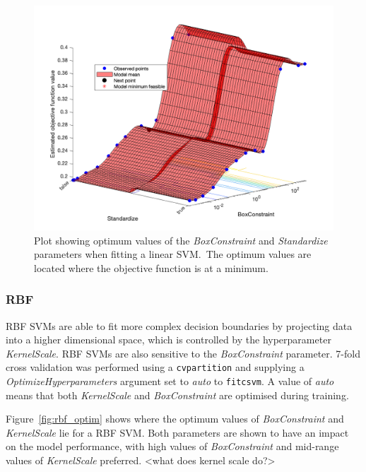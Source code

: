 \begin{figure}[ht]
  \centering
  \includegraphics[width=\textwidth]{figures/linear_optim.png}
  \caption{Plot showing optimum values of the \textit{BoxConstraint} and
  \textit{Standardize} parameters when fitting a linear SVM.\ The optimum values
are located where the objective function is at a
minimum.}\label{fig:linear_optim}
\end{figure}

\subsubsection{RBF}

RBF SVMs are able to fit more complex decision boundaries by projecting data
into a higher dimensional space, which is controlled by the hyperparameter
\textit{KernelScale}. RBF SVMs are also sensitive to the \textit{BoxConstraint}
parameter. 7-fold cross validation was performed using a \texttt{cvpartition}
and supplying a \textit{OptimizeHyperparameters} argument set to \textit{auto}
to \texttt{fitcsvm}. A value of \textit{auto} means that both
\textit{KernelScale} and \textit{BoxConstraint} are optimised during training.

Figure~\ref{fig:rbf_optim} shows where the optimum values of
\textit{BoxConstraint} and \textit{KernelScale} lie for a RBF SVM\@. Both
parameters are shown to have an impact on the model performance, with high
values of \textit{BoxConstraint} and mid-range values of \textit{KernelScale}
preferred. <what does kernel scale do?>


